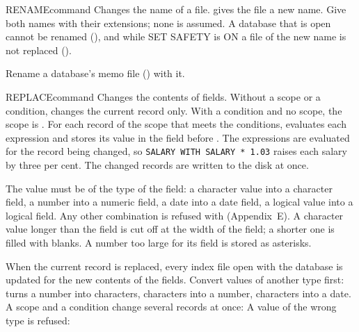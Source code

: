 \begin{XbaseEntry}{RENAME}{command}
Changes the name of a file.
\Syntax
{}
\Usage
{} gives the file a new name.  Give both names with their
extensions; none is assumed.  A database that is open cannot be renamed
(), and while SET SAFETY is ON a file of the
new name is not replaced ().

Rename a database's memo file () with it.
\Examples
{}
\end{XbaseEntry}

\begin{XbaseEntry}{REPLACE}{command}
Changes the contents of fields.
\Syntax
{}
\Defaults
Without a scope or a condition,  changes the current record
only.  With a  condition and no scope, the scope is .
\Usage
For each record of the scope that meets the conditions, 
evaluates each expression and stores its value in the field before
.  The expressions are evaluated for the record being changed, so
\texttt{SALARY WITH SALARY * 1.03} raises each salary by three per cent.  The
changed records are written to the disk at once.

The value must be of the type of the field: a character value into a
character field, a number into a numeric field, a date into a date field, a
logical value into a logical field.
  Any other combination is
refused with  (Appendix~E).  A character value
longer than the field is cut off at the width of the field; a shorter one is
filled with blanks.  A number too large for its field is stored as asterisks.

When the current record is replaced, every index file open with the database
is updated for the new contents of the fields.
\Tips
Convert values of another type first:  turns a number into
characters,  characters into a number,  characters into
a date.
\Examples
{}
A scope and a condition change several records at once:
A value of the wrong type is refused:
\end{XbaseEntry}


